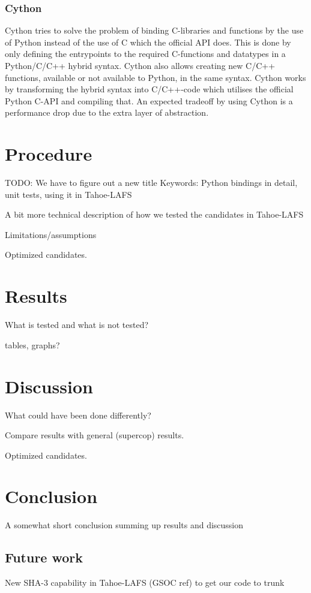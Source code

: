 \documentclass[english,12pt,a4paper]{book}
\begin{document}
\subsection{Cython}
Cython tries to solve the problem of binding C-libraries and functions by the
use of Python instead of the use of C which the official API does. This is done
by only defining the entrypoints to the required C-functions and datatypes in a
Python/C/C++ hybrid syntax. Cython also allows creating new C/C++ functions,
available or not available to Python, in the same syntax. Cython works by
transforming the hybrid syntax into C/C++-code which utilises the official
Python C-API and compiling that. An expected tradeoff by using Cython is a
performance drop due to the extra layer of abstraction.


\chapter{Procedure}

TODO: We have to figure out a new title
Keywords: Python bindings in detail, unit tests, using it in Tahoe-LAFS

A bit more technical description of how we tested the candidates in Tahoe-LAFS

Limitations/assumptions

Optimized candidates.


\chapter{Results}

What is tested and what is not tested?

tables, graphs?


\chapter{Discussion}

What could have been done differently?

Compare results with general (supercop) results.

Optimized candidates.

\cite{s_nistround2}


\chapter{Conclusion}

A somewhat short conclusion summing up results and discussion

\section{Future work}

New SHA-3 capability in Tahoe-LAFS (GSOC ref) to get our code to trunk





\appendix
\appendixpage
\addappheadtotoc

\end{document}
